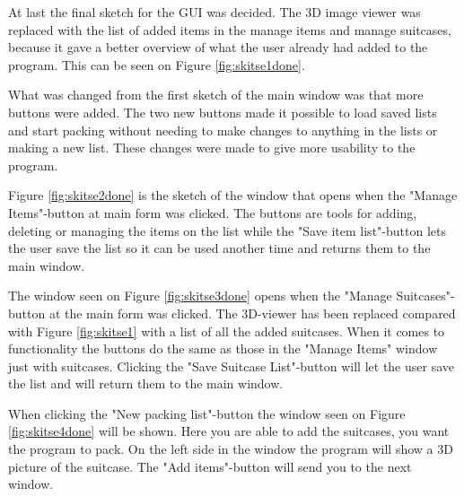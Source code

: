 At last the final sketch for the GUI was decided. The 3D image viewer was replaced with the list of added items in the manage items and manage suitcases, because it gave a better overview of what the user already had added to the program. This can be seen on Figure \ref{fig:skitse1done}.


What was changed from the first sketch of the main window was that more buttons were added. The two new buttons made it possible to load saved lists and start packing without needing to make changes to anything in the lists or making a new list.
These changes were made to give more usability to the program.


Figure \ref{fig:skitse2done} is the sketch of the window that opens when the "Manage Items"-button at main form was clicked. The buttons are tools for adding, deleting or managing the items on the list while the "Save item list"-button lets the user save the list so it can be used another time and returns them to the main window.


The window seen on Figure \ref{fig:skitse3done} opens when the "Manage Suitcases"-button at the main form was clicked. The 3D-viewer has been replaced compared with Figure \ref{fig:skitse1} with a list of all the added suitcases. When it comes to functionality the buttons do the same as those in the "Manage Items" window just with suitcases. Clicking the "Save Suitcase List"-button will let the user save the list and will return them to the main window.


When clicking the "New packing list"-button the window seen on Figure \ref{fig:skitse4done} will be shown. Here you are able to add the suitcases, you want the program to pack. On the left side in the window the program will show a 3D picture of the suitcase. The "Add items"-button will send you to the next window.


